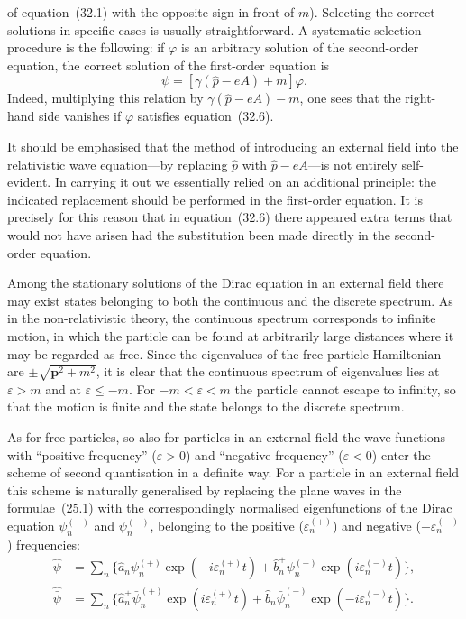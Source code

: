 of equation~(32.1) with the opposite sign in front of $m$). Selecting the correct solutions in specific cases is usually straightforward. A systematic selection procedure is the following: if $\varphi$ is an arbitrary solution of the second-order equation, the correct solution of the first-order equation is
\begin{equation}
\psi = [\gamma(\widehat p - eA) + m]\varphi.
\tag{32.8}
\end{equation}
Indeed, multiplying this relation by $\gamma(\widehat p - eA) - m$, one sees that the right-hand side vanishes if $\varphi$ satisfies equation~(32.6).

It should be emphasised that the method of introducing an external field into the relativistic wave equation---by replacing $\widehat p$ with $\widehat p - eA$---is not entirely self-evident. In carrying it out we essentially relied on an additional principle: the indicated replacement should be performed in the first-order equation. It is precisely for this reason that in equation~(32.6) there appeared extra terms that would not have arisen had the substitution been made directly in the second-order equation.

Among the stationary solutions of the Dirac equation in an external field there may exist states belonging to both the continuous and the discrete spectrum. As in the non-relativistic theory, the continuous spectrum corresponds to infinite motion, in which the particle can be found at arbitrarily large distances where it may be regarded as free. Since the eigenvalues of the free-particle Hamiltonian are $\pm\sqrt{\mathbf{p}^2 + m^2}$, it is clear that the continuous spectrum of eigenvalues lies at $\varepsilon > m$ and at $\varepsilon \leq -m$. For $-m < \varepsilon < m$ the particle cannot escape to infinity, so that the motion is finite and the state belongs to the discrete spectrum.

As for free particles, so also for particles in an external field the wave functions with ``positive frequency'' ($\varepsilon > 0$) and ``negative frequency'' ($\varepsilon < 0$) enter the scheme of second quantisation in a definite way. For a particle in an external field this scheme is naturally generalised by replacing the plane waves in the formulae~(25.1) with the correspondingly normalised eigenfunctions of the Dirac equation $\psi_n^{(+)}$ and $\psi_n^{(-)}$, belonging to the positive ($\varepsilon_n^{(+)}$) and negative ($-\varepsilon_n^{(-)}$) frequencies:
\begin{equation}
\begin{aligned}
\widehat\psi &= \sum_n\{\widehat a_n\psi^{(+)}_n\exp(-i\varepsilon^{(+)}_n t) + \widehat b^+_n\psi^{(-)}_n\exp(i\varepsilon^{(-)}_n t)\},\\
\widehat{\bar\psi} &= \sum_n\{\widehat a^+_n\bar\psi^{(+)}_n\exp(i\varepsilon^{(+)}_n t) + \widehat b_n\bar\psi^{(-)}_n\exp(-i\varepsilon^{(-)}_n t)\}.
\end{aligned}
\tag{32.9}
\end{equation}

